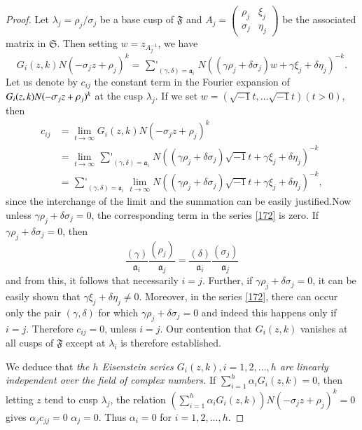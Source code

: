 \begin{proof}
Let $\lambda_{j}=\rho_{j}/\sigma_{j}$ be a base cusp of $\mathfrak{F}$
and $A_{j}=\left(\begin{smallmatrix} \rho_{j} & \xi_{j}\\ \sigma_{j} &
  \eta_{j}\end{smallmatrix}\right)$ be the associated matrix in
$\mathfrak{S}$. Then setting $w=z_{A^{-1}_{j}}$, we have
$$
G_{i}(z,k)N(-\sigma_{j}z+\rho_{j})^{k}=\mathop{{\sum}'}_{(\gamma,\delta)=\mathfrak{a}_{i}}N((\gamma\rho_{j}+\delta\sigma_{j})w+\gamma\xi_{j}+\delta\eta_{j})^{-k}.
$$
Let us denote by $c_{ij}$ the constant term in the Fourier expansion
of $G_{i}(z,k)\break N(-\sigma_{j}z+\rho_{j})^{k}$ at the cusp
$\lambda_{j}$. If we set $w=(\sqrt{-1}t,\ldots\sqrt{-1}t)(t>0)$, then
\begin{align*}
c_{ij} &= \lim\limits_{t\to
  \infty}G_{i}(z,k)N(-\sigma_{j}z+\rho_{j})^{k}\\
&= \lim\limits_{t\to
  \infty}\mathop{{\sum}'}_{(\gamma,\delta)=\mathfrak{a}_{i}}N((\gamma\rho_{j}+\delta\sigma_{j})\sqrt{-1}t+\gamma\xi_{j}+\delta\eta_{j})^{-k}\\
&=
\mathop{{\sum}'}_{(\gamma,\delta)=\mathfrak{a}_{i}}\lim\limits_{t\to
  \infty}N((\gamma\rho_{j}+\delta\sigma_{j})\sqrt{-1}t+\gamma\xi_{j}+\delta\eta_{j})^{-k},\tag{172}\label{172} 
\end{align*}
since the interchange of the limit and the summation can be easily
justified.\pageoriginale Now unless
$\gamma\rho_{j}+\delta\sigma_{j}=0$, the corresponding term in the
series \eqref{172} is zero. If $\gamma\rho_{j}+\delta\sigma_{j}=0$,
then
$$
\frac{(\gamma)}{\mathfrak{a}_{i}}\frac{(\rho_{j})}{\mathfrak{a}_{j}}=\frac{(\delta)}{\mathfrak{a}_{i}}\frac{(\sigma_{j})}{\mathfrak{a}_{j}}
$$
and from this, it follows that necessarily $i=j$. Further, if
$\gamma\rho_{j}+\delta\sigma_{j}=0$, it can be easily shown that
$\gamma\xi_{j}+\delta\eta_{j}\neq 0$. Moreover, in the series
\eqref{172}, there can occur only the pair $(\gamma,\delta)$ for which
$\gamma\rho_{j}+\delta\sigma_{j}=0$ and indeed this happens only if
$i=j$. Therefore $c_{ij}=0$, unless $i=j$. Our contention that
$G_{i}(z,k)$ vanishes at all cusps of $\mathfrak{F}$ except at
$\lambda_{i}$ is therefore established.

We deduce that {\em the $h$ Eisenstein series
  $G_{i}(z,k),i=1,2,\ldots,h$ are linearly independent over the field
  of complex numbers.} If
$\sum\limits^{h}_{i=1}\alpha_{i}G_{i}(z,k)=0$, then letting $z$ tend
to cusp $\lambda_{j}$, the relation
$\left(\sum\limits^{h}_{i=1}\alpha_{i}G_{i}(z,k)\right)N(-\sigma_{j}z+\rho_{j})^{k}=0$
gives $\alpha_{j}c_{jj}=0$ \ie $\alpha_{j}=0$. Thus $\alpha_{i}=0$ for
$i=1,2,\ldots,h$. 
\end{proof}


